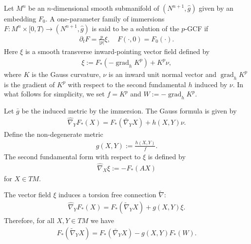 \documentclass{amsart}
\theoremstyle{definition}
\theoremstyle{remark}
\numberwithin{equation}{section}
\begin{document}
\title[]
 {}

\curraddr{}
\email{}
\date{\today}

\dedicatory{}
\subjclass[2010]{}
\keywords{}

\begin{abstract}

\end{abstract}

\maketitle
Let $M^n$ be an $n$-dimensional smooth submanifold of $(N^{n+1},\hat{g})$ given by an embedding $F_0.$ A one-parameter family of immersions $F\colon M^n\times [0,T)\to (N^{n+1},\hat{g})$ is said to be a solution of the $ p $-GCF if
\begin{align}
\partial_tF=\frac{p}{|p|}\xi,\quad F(\cdot,0)=F_0(\cdot).
\end{align}
Here $\xi $ is a smooth transverse inward-pointing vector field defined by
\begin{align}
\xi:=F_{\ast}(-\operatorname{grad}_hK^p)+ K ^{ p }\nu,
\end{align}
where $ K $ is the Gauss curvature, $\nu$ is an inward unit normal vector and $\operatorname{grad}_hK^{p}$ is the gradient of $K^{p}$ with respect to the second fundamental $h$ induced by $\nu.$ In what follows for simplicity, we set $ f = K ^{ p }$ and $W:=-\operatorname{grad}_hK^{p}.$

Let $\bar{g}$ be the induced metric by the immersion. The Gauss formula is given by
\begin{align}\label{gauss equ}
\hat{\nabla}_YF_{\ast}(X)=F_{\ast}(\bar{\nabla}_YX)+h(X,Y)\nu.
\end{align}
Define the non-degenerate metric
\begin{align}
g(X,Y):=\frac{h(X,Y)}{ f }.
\end{align}
The second fundamental form with respect to $\xi$ is defined by
\begin{align}
\hat{\nabla}_X\xi:=-F_{\ast}(AX)
\end{align}
for $X\in TM$.

The vector field $\xi$ induces a torsion free connection $\tilde{\nabla}$:
\begin{align}\label{gauss equ2}
\hat{\nabla}_YF_{\ast}(X)=F_{\ast}(\tilde{\nabla}_YX)+g(X,Y)\xi.
\end{align}
Therefore, for all $X,Y\in TM$ we have
\begin{align}
F_{\ast}(\tilde{\nabla}_Y X)=F_{\ast}(\bar{\nabla}_YX)-g(X,Y)F_{\ast}(W).
\end{align}
\end{document}
